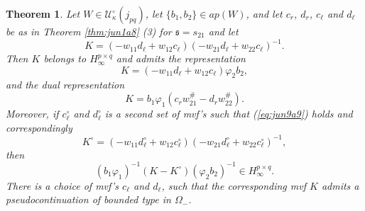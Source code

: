\documentclass[12pt,twoside,a4paper]{amsart}
\newtheorem{thm}{Theorem}[section]
\theoremstyle{definition}
\numberwithin{equation}{section}
\begin{document}
\begin{thm}\label{thm:11.7}
Let $W\in {{\mathcal U}}_\kappa^\circ(j_{pq})$, 
 let $\{b_1,
b_2\}\in ap(W)$, and let $c_r$, $d_r$, $c_\ell$ and $d_\ell$ be as in
Theorem \ref{thm:jun1a8} (3) for ${{\mathfrak s}}=s_{21}$ and let
\begin{equation}
\label{eq:jun10a9}
K=(-w_{11}d_\ell+w_{12}c_\ell)(-w_{21}d_\ell+w_{22}c_\ell)^{-1}.
\end{equation}
Then $K$ belongs to $H_\infty^{p\times q}$ and admits the representation
\begin{equation}\label{eq:11.28}
    K=(-w_{11}d_\ell+w_{12}c_\ell)\varphi_2b_2,
\end{equation}
and the dual representation
\begin{equation}\label{eq:11.29}
    K=b_1\varphi_1(c_rw_{21}^\#-d_rw_{22}^\#).
\end{equation}
Moreover, if $c_\ell^\circ$ and $d_\ell^\circ$ is a
second set of mvf's
such that (\ref{eq:jun9a9})
holds and correspondingly
\begin{equation}\label{eq:Kcirc}
    K^\circ=(-w_{11}d_\ell^\circ +w_{12}c_\ell^\circ)
(-w_{21}d_\ell^\circ +w_{22}c_\ell^\circ)^{-1},
\end{equation}
then
\begin{equation}
\label{eq:jun9d9}
(b_1\varphi_1)^{-1}(K-K^\circ)(\varphi_2b_2)^{-1}\in H_\infty^{p\times q}.
\end{equation}
There is a choice of mvf's $c_\ell$ and $d_\ell$,  such that the
corresponding mvf $K$ admits a
pseudocontinuation  of bounded type in $\Omega_-$.
\end{thm}
\end{document}
